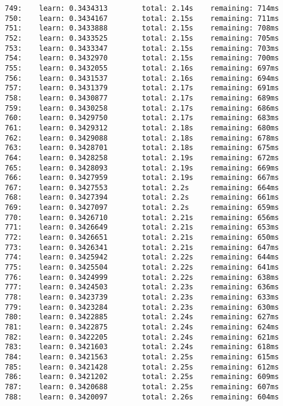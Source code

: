 \documentclass[11pt]{article}
\begin{document}
\begin{Verbatim}[commandchars=\\\{\}]
749:    learn: 0.3434313        total: 2.14s    remaining: 714ms
750:    learn: 0.3434167        total: 2.15s    remaining: 711ms
751:    learn: 0.3433888        total: 2.15s    remaining: 708ms
752:    learn: 0.3433525        total: 2.15s    remaining: 705ms
753:    learn: 0.3433347        total: 2.15s    remaining: 703ms
754:    learn: 0.3432970        total: 2.15s    remaining: 700ms
755:    learn: 0.3432055        total: 2.16s    remaining: 697ms
756:    learn: 0.3431537        total: 2.16s    remaining: 694ms
757:    learn: 0.3431379        total: 2.17s    remaining: 691ms
758:    learn: 0.3430877        total: 2.17s    remaining: 689ms
759:    learn: 0.3430258        total: 2.17s    remaining: 686ms
760:    learn: 0.3429750        total: 2.17s    remaining: 683ms
761:    learn: 0.3429312        total: 2.18s    remaining: 680ms
762:    learn: 0.3429088        total: 2.18s    remaining: 678ms
763:    learn: 0.3428701        total: 2.18s    remaining: 675ms
764:    learn: 0.3428258        total: 2.19s    remaining: 672ms
765:    learn: 0.3428093        total: 2.19s    remaining: 669ms
766:    learn: 0.3427959        total: 2.19s    remaining: 667ms
767:    learn: 0.3427553        total: 2.2s     remaining: 664ms
768:    learn: 0.3427394        total: 2.2s     remaining: 661ms
769:    learn: 0.3427097        total: 2.2s     remaining: 659ms
770:    learn: 0.3426710        total: 2.21s    remaining: 656ms
771:    learn: 0.3426649        total: 2.21s    remaining: 653ms
772:    learn: 0.3426651        total: 2.21s    remaining: 650ms
773:    learn: 0.3426341        total: 2.21s    remaining: 647ms
774:    learn: 0.3425942        total: 2.22s    remaining: 644ms
775:    learn: 0.3425504        total: 2.22s    remaining: 641ms
776:    learn: 0.3424999        total: 2.22s    remaining: 638ms
777:    learn: 0.3424503        total: 2.23s    remaining: 636ms
778:    learn: 0.3423739        total: 2.23s    remaining: 633ms
779:    learn: 0.3423284        total: 2.23s    remaining: 630ms
780:    learn: 0.3422885        total: 2.24s    remaining: 627ms
781:    learn: 0.3422875        total: 2.24s    remaining: 624ms
782:    learn: 0.3422205        total: 2.24s    remaining: 621ms
783:    learn: 0.3421603        total: 2.24s    remaining: 618ms
784:    learn: 0.3421563        total: 2.25s    remaining: 615ms
785:    learn: 0.3421428        total: 2.25s    remaining: 612ms
786:    learn: 0.3421202        total: 2.25s    remaining: 609ms
787:    learn: 0.3420688        total: 2.25s    remaining: 607ms
788:    learn: 0.3420097        total: 2.26s    remaining: 604ms

\end{Verbatim}
\end{document}
